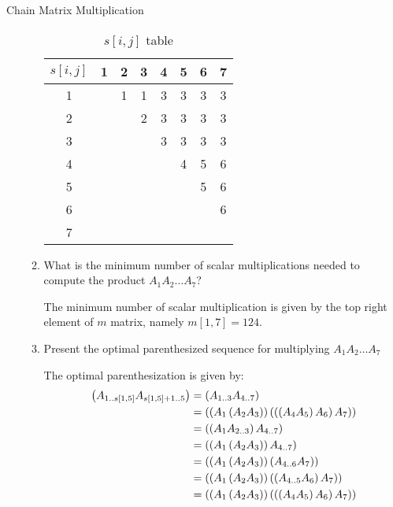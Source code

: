 \documentclass{article}
\numberwithin{table}{section}
\numberwithin{figure}{section}
\begin{document}
\begin{section}{Chain Matrix Multiplication}
\begin{enumerate}
\begin{enumerate}
\begin{tcolorbox}
\begin{table}[H]
                \begin{tabular}{|c|c|c|c|c|c|c|c|}
                    \hline
                    $s[i,j]$ & 1 & 2 & 3 & 4 & 5 & 6 & 7\\
                    \hline
                    1 & & 1 & 1 & 3 & 3 & 3 & 3\\
                    2 & & & 2 & 3 & 3 & 3 & 3\\
                    3 & & & & 3 & 3 & 3 & 3\\
                    4 & & & & & 4 & 5 & 6\\
                    5 & & & & & & 5 & 6\\
                    6 & & & & & & & 6\\
                    7 & & & & & & &\\
                    \hline
                \end{tabular}
                \caption{$s[i,j]$ table}
                \label{tab:p3_b1}
            \end{table}
        \end{tcolorbox}
        
        \item What is the minimum number of scalar multiplications needed to compute the product $A_1 A_2 \dots A_7$?
        \begin{tcolorbox}
            The minimum number of scalar multiplication is given by the top right element of $m$ matrix, namely $m[1,7] = 124$.
        \end{tcolorbox}
        
        \item Present the optimal parenthesized sequence for multiplying $A_1 A_2 \dots A_7$
        \begin{tcolorbox}
            The optimal parenthesization is given by:
            \begin{align*}
                \left(A_{1..s[1,5]}A_{s[1,5]+1..5}\right) &= \left(A_{1..3}A_{4..7}\right) \\
                &= \left(\left(A_1\left(A_2 A_3\right)\right)\left(\left(\left(A_4 A_5\right) A_6\right)A_7\right)\right) \\
                &= \left(\left(A_1A_{2..3}\right)A_{4..7}\right) \\
                &= \left(\left(A_1\left(A_2 A_3\right)\right)A_{4..7}\right) \\
                &= \left(\left(A_1\left(A_2 A_3\right)\right)\left(A_{4..6}A_7\right)\right) \\
                &= \left(\left(A_1\left(A_2 A_3\right)\right)\left(\left(A_{4..5}A_6\right)A_7\right)\right) \\
                &= \left(\left(A_1\left(A_2 A_3\right)\right)\left(\left(\left(A_4A_5\right)A_6\right)A_7\right)\right)
            \end{align*}
        \end{tcolorbox}
    \end{enumerate}
\end{enumerate}
\end{section}
\end{document}
